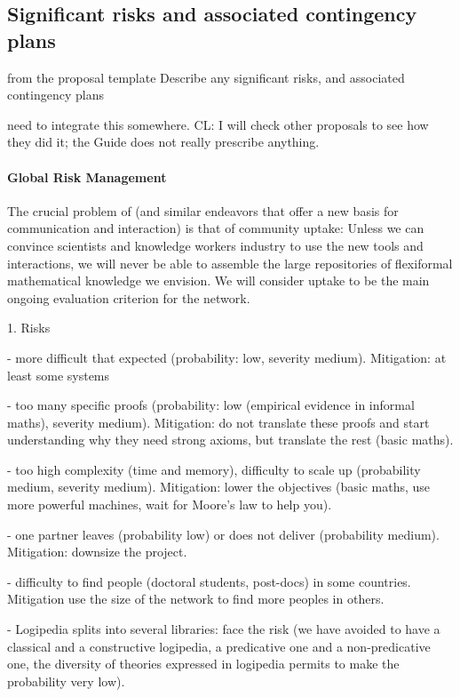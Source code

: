 \subsection{Significant risks and associated contingency plans}\label{sec:risks}

\begin{todo}{from the proposal template}
  Describe any significant risks, and associated contingency plans
\end{todo}
\begin{oldpart}{need to integrate this somewhere. CL: I will check other proposals to see how they did it; the Guide does not really prescribe anything.}
\paragraph{Global Risk Management}
The crucial problem of \pn (and similar endeavors that offer a new basis for communication
and interaction) is that of community uptake: Unless we can convince scientists and
knowledge workers industry to use the new tools and interactions, we will
never be able to assemble the large repositories of flexiformal mathematical knowledge we
envision. We will consider uptake to be the main ongoing evaluation criterion for the network.
\end{oldpart}



1. Risks

- more difficult that expected (probability: low, severity medium). Mitigation: at least some systems

- too many specific proofs (probability: low (empirical evidence in informal maths), severity medium). Mitigation: do not translate these proofs and start understanding why they need strong axioms, but translate the rest (basic maths).

- too high complexity (time and memory), difficulty to scale up (probability medium, severity medium). Mitigation: lower the objectives (basic maths, use more powerful machines, wait for Moore's law to help you).

- one partner leaves (probability low) or does not deliver (probability medium). Mitigation: downsize the project.

- difficulty to find people (doctoral students, post-docs) in some countries. Mitigation use the size of the network to find more peoples in others.

- Logipedia splits into several libraries: face the risk  (we have avoided to have a classical and a constructive logipedia, a predicative one and a non-predicative one, the diversity of theories expressed in logipedia permits to make the probability very low). 

